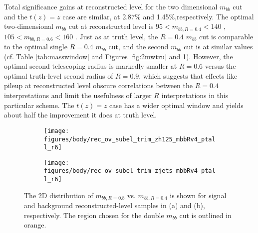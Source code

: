 Total significance gains at reconstructed level for the two dimensional $m_{bb}$ cut and the $t\left(z\right)=z$ case are similar, at 2.87\% and 1.45\%,respectively.  The optimal two-dimensional $m_{bb}$ cut at reconstructed level is $95<m_{bb,R=0.4}<140$ \GeV, $105<m_{bb,R=0.6}<160$ \GeV.  Just as at truth level, the $R=0.4$ $m_{bb}$ cut is comparable to the optimal single $R=0.4$ $m_{bb}$ cut, and the second $m_{bb}$ cut is at similar values (cf. Table \ref{tab:masswindow} and Figures \ref{fig:2mwtru} and \ref{fig:2mwrec}).  However, the optimal second telescoping radius is markedly smaller at $R=0.6$ versus the optimal truth-level second radius of $R=0.9$, which suggests that effects like pileup at reconstructed level obscure correlations between the $R=0.4$ interpretations and limit the usefulness of larger $R$ interpretations in this particular scheme. The $t\left(z\right)=z$ case has a wider optimal window and yields about half the improvement it does at truth level.%

\begin{figure}[!htbp]\captionsetup{justification=centering}
\begin{center}
\begin{subfigure}[t]{18pc}\centering\texttt{[image: figures/body/rec\_ov\_subel\_trim\_zh125\_mbbRv4\_ptall\_r6]}\caption{}\end{subfigure}
\begin{subfigure}[t]{18pc}\centering\texttt{[image: figures/body/rec\_ov\_subel\_trim\_zjets\_mbbRv4\_ptall\_r6]}\caption{}\end{subfigure}
\caption{\label{fig:2mwrec}The 2D distribution of $m_{bb,R=0.8}$ vs. $m_{bb,R=0.4}$ is shown for signal and background reconstructed-level samples in (a) and (b), respectively.  The region chosen for the double $m_{bb}$ cut is outlined in orange.}
\end{center}
\end{figure}

